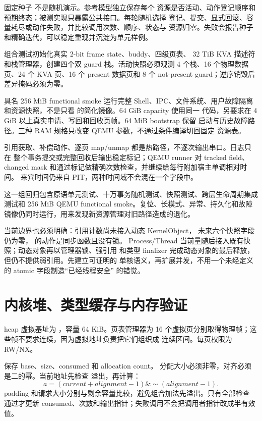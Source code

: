 固定种子  不是随机演示。参考模型独立保存每个
资源是否活动、动作登记顺序和预期终态；被测实现只暴露公共接口。每轮随机选择
登记、提交、显式回滚、容量耗尽或动作失败，并比较调用次数、顺序、状态与
资源归零。失败会报告种子和精确迭代，可以稳定重现并沉淀为单元样例。

组合测试初始化真实 2-bit frame state、buddy、四级页表、
32 TiB KVA 描述符和栈管理器，创建四个双 guard 栈。活动快照必须观测
4 个栈、16 个物理数据页、24 个 KVA 页、16 个 present 数据页和 8 个
not-present guard；逆序销毁后差异掩码必须为零。

具名 256 MiB functional smoke 运行完整 Shell、IPC、文件系统、用户故障隔离
和资源快照，不是只看  的简化镜像。64 GiB capacity 使用同一
代码，另要求在 4 GiB 以上真实申请、写回和回收页帧。64 MiB bootstrap 保留
启动与历史故障路径。三种 RAM 规格只改变 QEMU 参数，不通过条件编译切回固定
资源表。

引用获取、补偿动作、逐页 map/unmap 都是热路径，不逐次输出串口。日志只在
整个事务提交或完整回收后输出稳定标记；QEMU runner 对 tracked field、
changed mask 和通过标记做精确次数检查，并继续给每行附加宿主单调相对时间。
来宾时间仍来自 PIT，两种时间域不会混在一个字段中。

这一组回归包含原语单元测试、十万事务随机测试、快照测试、跨层生命周期集成
测试和 256 MiB QEMU functional smoke。复位、长模式、异常、持久化和故障
镜像仍同时运行，用来发现新资源管理对旧路径造成的退化。

当前边界也必须明确：引用计数尚未接入动态 KernelObject，
未来六个快照字段仍为零， 的动作是同步函数且没有锁。
Process/Thread 当前量随后接入既有快照；动态对象再以管理器锁、强引用
和类型 finalizer 完成动态对象的最后释放，但仍不提供弱引用。先建立可证明的
单核语义，再扩展并发，不用一个未经定义的 atomic 字段制造“已经线程安全”
的错觉。

\section{内核堆、类型缓存与内存验证}

heap 虚拟基址为 ，容量 64 KiB。页表管理器为
16 个虚拟页分别取得物理帧；这些帧不要求连续，因为虚拟地址负责把它们组织成
连续区间。每页权限为 RW/NX。

 保存 base、size、consumed 和 allocation count。
分配大小必须非零，对齐必须是二的幂。当前地址先检查
 溢出，再计算：
\[
  a=(current+alignment-1)\mathbin{\&}\sim(alignment-1).
\]
padding 和请求大小分别与剩余容量比较，避免组合加法先溢出。只有全部检查
通过才更新 consumed、次数和输出指针；失败调用不会把调用者指针改成半有效值。

